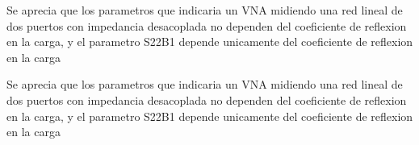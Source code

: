 \documentclass{article}
\begin{document}
\begin{maplegroup}
\mapleresult
\begin{maplelatex}
\end{maplelatex}
\end{maplegroup}
\begin{maplegroup}
\mapleresult
\begin{maplelatex}
\end{maplelatex}
\end{maplegroup}
\begin{maplegroup}
\mapleresult
\begin{maplelatex}
\end{maplelatex}
\end{maplegroup}
\begin{Maple Normal}{
\begin{Maple Normal}{
Se aprecia que los parametros que indicaria un VNA midiendo una red lineal de dos puertos con impedancia desacoplada no dependen del coeficiente de reflexion en la carga, y el parametro S22B1 depende unicamente del coeficiente de reflexion en la carga}\end{Maple Normal}

\begin{Maple Normal}{
Se aprecia que los parametros que indicaria un VNA midiendo una red lineal de dos puertos con impedancia desacoplada no dependen del coeficiente de reflexion en la carga, y el parametro S22B1 depende unicamente del coeficiente de reflexion en la carga}\end{Maple Normal}

}\end{Maple Normal}
\end{document}
